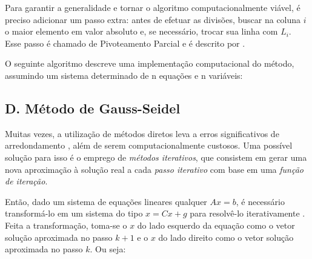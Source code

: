 \documentclass[twocolumn, 10pt]{extarticle}
\begin{document}
Para garantir a generalidade e tornar o algoritmo computacionalmente viável, é preciso adicionar um passo extra: antes de efetuar as divisões, buscar na coluna $i$ o maior elemento em valor absoluto e, se necessário, trocar sua linha com $L_i$. Esse passo é chamado de Pivoteamento Parcial e é descrito por \cite[p. 127]{ruggiero}.

O seguinte algoritmo descreve uma implementação computacional do método, assumindo um sistema determinado de n equações e n variáveis:

\begingroup
{}\label{gj}
\begin{algorithmic}[1]
  		\EndIf
	\EndFor
	\EndIf
\EndFunction
{}
		\EndFor
			\EndIf		
			\EndFor	
		\EndFor
	\EndFor
\EndFunction
\end{algorithmic}
\hrulefill
\endgroup

\subsection*{D. \quad Método de Gauss-Seidel}

Muitas vezes, a utilização de métodos diretos leva a erros significativos de arredondamento \cite[p. 173]{augusto}, além de serem computacionalmente custosos. Uma possível solução para isso é o emprego de \textit{métodos iterativos}, que consistem em gerar uma nova aproximação à solução real a cada \textit{passo iterativo} com base em uma \textit{função de iteração}.

Então, dado um sistema de equações lineares qualquer $Ax = b$, é necessário transformá-lo em um sistema do tipo $x = Cx + g$ para resolvê-lo iterativamente \cite[p. 167]{ruggiero}. Feita a transformação, toma-se o $x$ do lado esquerdo da equação como o vetor solução aproximada no passo $k+1$ e o $x$ do lado direito como o vetor solução aproximada no passo $k$. Ou seja:
\end{document}
